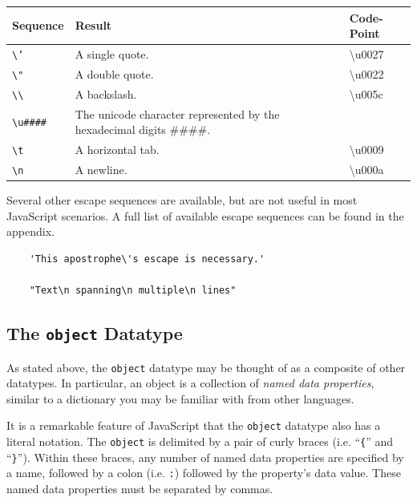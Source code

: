 \documentclass[11pt,letter]{book}
\begin{document}
    \vspace{10pt}
    \begin{tabular}{l|l|l}
        Sequence & Result & Code-Point \\
        \hline
        \texttt{\textbackslash{'}}  & A single quote. & \textbackslash{u0027} \\
        \texttt{\textbackslash{"}}  & A double quote. & \textbackslash{u0022} \\
        \texttt{\textbackslash\textbackslash} 
                                    & A backslash. & \textbackslash{u005c} \\
        \texttt{\textbackslash{u\#\#\#\#}}
                                    & The unicode character represented by the hexadecimal
                                        digits \#\#\#\#. & \\
        \texttt{\textbackslash{t}}  & A horizontal tab. & \textbackslash{u0009} \\
        \texttt{\textbackslash{n}}  & A newline. & \textbackslash{u000a} \\
    \end{tabular}
    \vspace{10pt}
    
    Several other escape sequences are available, but are not useful in most JavaScript scenarios. 
    A full list of available escape sequences can be found in the appendix.
    
    \begin{verbatim}
    'This apostrophe\'s escape is necessary.'
    
    "Text\n spanning\n multiple\n lines"
    \end{verbatim}
    
    \subsection{The \texttt{object} Datatype}
    
    As stated above, the \texttt{object} datatype may be thought of as a composite of other 
    datatypes. In particular, an object is a collection of \emph{named data properties}, similar
    to a dictionary you may be familiar with from other languages.
    
    It is a remarkable feature of JavaScript that the \texttt{object} datatype also has a literal
    notation. The \texttt{object} is delimited by a pair of curly braces (i.e. ``\texttt{\{}'' and 
    ``\texttt{\}}''). Within these braces, any number of named data properties are specified by a 
    name, followed by a colon (i.e. \texttt{:}) followed by the property's data value. These named 
    data properties must be separated by commas.
    
\end{document}
